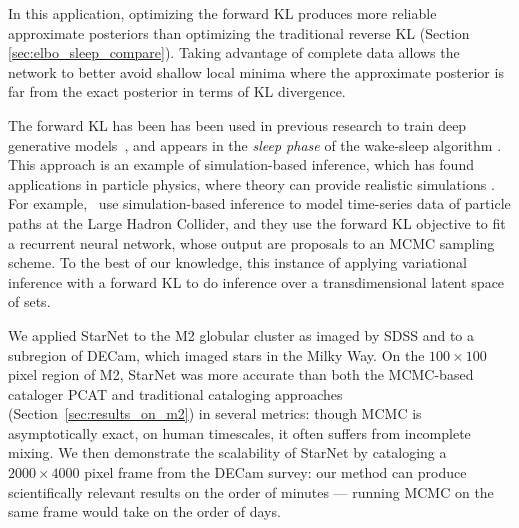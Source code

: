 In this application, optimizing the forward KL produces more reliable approximate
posteriors than optimizing the traditional reverse KL (Section \ref{sec:elbo_sleep_compare}).
Taking advantage of complete data allows the network to better avoid shallow local minima
where the approximate posterior is far from the exact posterior in terms of KL divergence.




The forward KL has been has been used in previous research to train deep generative
models~\citep{ambrogioni2019favi,le2020revisiting},
and appears in the \textit{sleep phase} of the wake-sleep algorithm
\citep{Hinton1995wake_sleep, bornschein2014reweighted,le2020revisiting}. 
This approach is an example of simulation-based inference, 
which has found applications in particle physics, where theory can provide realistic simulations \citep{Cranmer_2020}. For example,~\cite{Baydin2019} use simulation-based inference to model
time-series data of particle paths at the Large Hadron Collider, 
and they use the forward KL objective to fit a recurrent neural network, 
whose output are proposals to an MCMC sampling scheme. 
To the best of our knowledge, this instance of applying variational inference with a forward KL to do inference over a transdimensional 
latent space of sets. 



We applied StarNet to the M2 globular cluster as imaged by SDSS
and to a subregion of DECam, which imaged stars in the Milky Way.
On the $100 \times 100$ pixel region of M2,
StarNet was more accurate than both the MCMC-based cataloger PCAT
and traditional cataloging approaches (Section~\ref{sec:results_on_m2}) in several metrics:
though MCMC is asymptotically exact, on human timescales, it often suffers from incomplete mixing. 
We then demonstrate the scalability of StarNet by cataloging a $2000\times4000$ pixel frame from the DECam survey:
our method can produce scientifically relevant results on the order of minutes ---
running MCMC on the same frame would take on the order of days.

